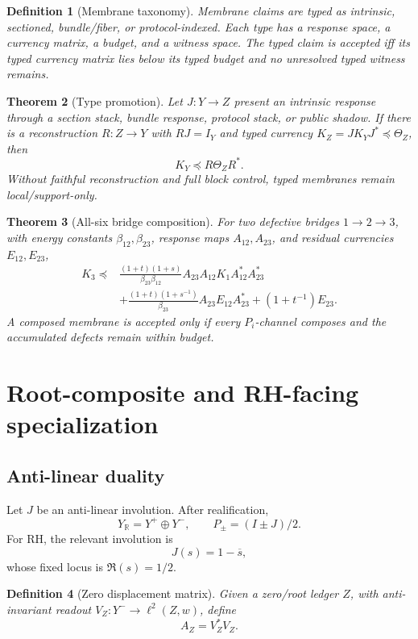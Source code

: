 \documentclass[11pt]{article}
\newtheorem{theorem}{Theorem}[section]
\newtheorem{definition}[theorem]{Definition}
\begin{document}
\begin{definition}[Membrane taxonomy]
Membrane claims are typed as intrinsic, sectioned, bundle/fiber, or protocol-indexed.  Each type has a response space, a currency matrix, a budget, and a witness space.  The typed claim is accepted iff its typed currency matrix lies below its typed budget and no unresolved typed witness remains.
\end{definition}

\begin{theorem}[Type promotion]
Let \(J:Y\to Z\) present an intrinsic response through a section stack, bundle response, protocol stack, or public shadow.  If there is a reconstruction \(R:Z\to Y\) with \(RJ=I_Y\) and typed currency \(K_Z=J K_YJ^*\preceq\Theta_Z\), then
\[
  K_Y\preceq R\Theta_ZR^*.
\]
Without faithful reconstruction and full block control, typed membranes remain local/support-only.
\end{theorem}

\begin{theorem}[All-six bridge composition]
For two defective bridges \(1\to2\to3\), with energy constants \(\beta_{12},\beta_{23}\), response maps \(A_{12},A_{23}\), and residual currencies \(E_{12},E_{23}\),
\[
\begin{aligned}
K_3\preceq{}&\frac{(1+t)(1+s)}{\beta_{23}\beta_{12}}A_{23}A_{12}K_1A_{12}^*A_{23}^*\\
&+\frac{(1+t)(1+s^{-1})}{\beta_{23}}A_{23}E_{12}A_{23}^*+(1+t^{-1})E_{23}.
\end{aligned}
\]
A composed membrane is accepted only if every \(P_i\)-channel composes and the accumulated defects remain within budget.
\end{theorem}

\section{Root-composite and RH-facing specialization}

\subsection{Anti-linear duality}
Let \(J\) be an anti-linear involution.  After realification,
\[
  Y_\mathbb R=Y^+\oplus Y^-,
  \qquad P_\pm=(I\pm J)/2.
\]
For RH, the relevant involution is
\[
  J(s)=1-\overline{s},
\]
whose fixed locus is \(\Re(s)=1/2\).

\begin{definition}[Zero displacement matrix]
Given a zero/root ledger \(Z\), with anti-invariant readout \(V_Z:Y^-\to\ell^2(Z,w)\), define
\[
  A_Z=V_Z^*V_Z.
\]
\end{definition}
\end{document}
